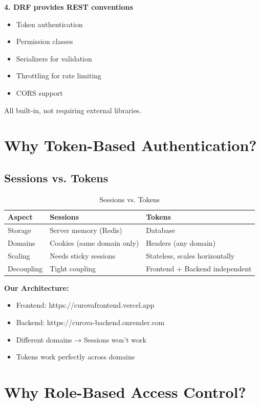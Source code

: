 \documentclass[11pt,a4paper,twoside]{report}
\begin{document}
\textbf{4. DRF provides REST conventions}

\begin{itemize}
    \item Token authentication
    \item Permission classes
    \item Serializers for validation
    \item Throttling for rate limiting
    \item CORS support
\end{itemize}

All built-in, not requiring external libraries.

\section{Why Token-Based Authentication?}

\subsection{Sessions vs. Tokens}

\begin{table}[H]
\centering
\begin{tabular}{|l|l|l|}
\hline
\textbf{Aspect} & \textbf{Sessions} & \textbf{Tokens} \\
\hline
Storage & Server memory (Redis) & Database \\
Domains & Cookies (same domain only) & Headers (any domain) \\
Scaling & Needs sticky sessions & Stateless, scales horizontally \\
Decoupling & Tight coupling & Frontend + Backend independent \\
\hline
\end{tabular}
\caption{Sessions vs. Tokens}
\end{table}

\textbf{Our Architecture:}
\begin{itemize}
    \item Frontend: https://curovafrontend.vercel.app
    \item Backend: https://curova-backend.onrender.com
    \item Different domains → Sessions won't work
    \item Tokens work perfectly across domains
\end{itemize}

\section{Why Role-Based Access Control?}
\end{document}
